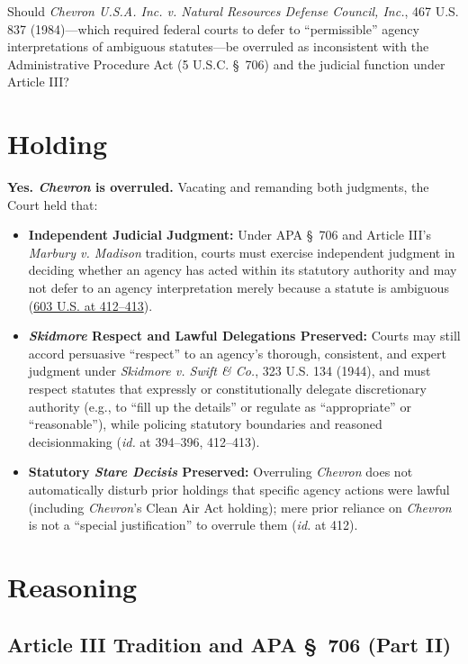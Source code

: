 \documentclass[12pt]{article}
\begin{document}
Should \textit{Chevron U.S.A. Inc. v. Natural Resources Defense Council, Inc.}, 467 U.S. 837 (1984)---which required federal courts to defer to ``permissible'' agency interpretations of ambiguous statutes---be overruled as inconsistent with the Administrative Procedure Act (5 U.S.C. \S~706) and the judicial function under Article III?

\section{Holding}

\textbf{Yes. \textit{Chevron} is overruled.} Vacating and remanding both judgments, the Court held that:

\begin{itemize}
  \item \textbf{Independent Judicial Judgment:} Under APA \S~706 and Article III's \textit{Marbury v. Madison} tradition, courts must exercise independent judgment in deciding whether an agency has acted within its statutory authority and may not defer to an agency interpretation merely because a statute is ambiguous (\href{https://www.law.cornell.edu/supremecourt/text/22-451}{603 U.S. at 412--413}).
  \item \textbf{\textit{Skidmore} Respect and Lawful Delegations Preserved:} Courts may still accord persuasive ``respect'' to an agency's thorough, consistent, and expert judgment under \textit{Skidmore v. Swift \& Co.}, 323 U.S. 134 (1944), and must respect statutes that expressly or constitutionally delegate discretionary authority (e.g., to ``fill up the details'' or regulate as ``appropriate'' or ``reasonable''), while policing statutory boundaries and reasoned decisionmaking (\textit{id.} at 394--396, 412--413).
  \item \textbf{Statutory \textit{Stare Decisis} Preserved:} Overruling \textit{Chevron} does not automatically disturb prior holdings that specific agency actions were lawful (including \textit{Chevron}'s Clean Air Act holding); mere prior reliance on \textit{Chevron} is not a ``special justification'' to overrule them (\textit{id.} at 412).
\end{itemize}

\section{Reasoning}

\subsection{Article III Tradition and APA \S~706 (Part II)}
\end{document}
